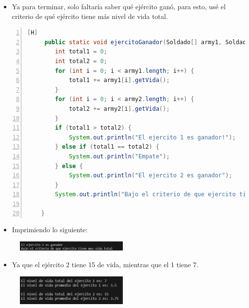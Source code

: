 \documentclass{article}
\begin{document}
	\begin{itemize}	
		\item Ya para terminar, solo faltaría saber qué ejército ganó, para esto, usé el criterio de qué ejército tiene más nivel de vida total.
	\end{itemize}
	
	\begin{lstlisting}[language=java,caption={Determinando el ganador}, numbers=left][H]
	 public static void ejercitoGanador(Soldado[] army1, Soldado[] army2) {
        int total1 = 0;
        int total2 = 0;
        for (int i = 0; i < army1.length; i++) {
            total1 += army1[i].getVida();
        }
        for (int i = 0; i < army2.length; i++) {
            total2 += army2[i].getVida();
        }
        if (total1 > total2) {
            System.out.println("El ejercito 1 es ganador!");
        } else if (total1 == total2) {
            System.out.println("Empate");
        } else {
            System.out.println("El ejercito 2 es ganador");
        }
        System.out.println("Bajo el criterio de que ejercito tiene mas vida total");

    }
	\end{lstlisting}
	\begin{itemize}	
		\item Imprimiendo lo siguiente: 
	\end{itemize}
	
	\begin{figure}[H]
		\centering
	\includegraphics[width=0.5\textwidth,keepaspectratio]{img/captura6.png}
	\end{figure}
	
	\begin{itemize}	
		\item Ya que el ejército 2 tiene 15 de vida, mientras que el 1 tiene 7. 
	\end{itemize}
	
	\begin{figure}[H]
		\centering
	\includegraphics[width=0.5\textwidth,keepaspectratio]{img/captura7.png}
	\end{figure}
	
\end{document}
